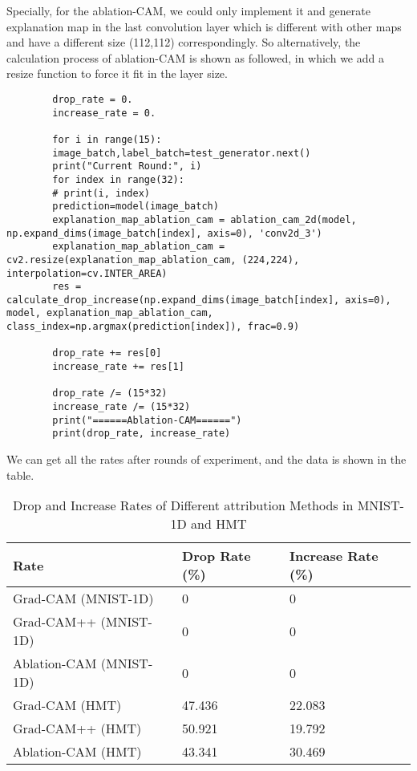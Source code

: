 \documentclass[conference]{IEEEtran}
\begin{document}
	Specially, for the ablation-CAM, we could only implement it and generate explanation map in the last convolution layer which is different with other maps and have a different size (112,112) correspondingly. So alternatively, the calculation process of ablation-CAM is shown as followed, in which we add a resize function to force it fit in the layer size.
	
	\begin{lstlisting}
		drop_rate = 0.
		increase_rate = 0.
		
		for i in range(15):
		image_batch,label_batch=test_generator.next()
		print("Current Round:", i)
		for index in range(32):
		# print(i, index)
		prediction=model(image_batch)
		explanation_map_ablation_cam = ablation_cam_2d(model, np.expand_dims(image_batch[index], axis=0), 'conv2d_3')
		explanation_map_ablation_cam = cv2.resize(explanation_map_ablation_cam, (224,224), interpolation=cv.INTER_AREA)
		res = calculate_drop_increase(np.expand_dims(image_batch[index], axis=0), model, explanation_map_ablation_cam, class_index=np.argmax(prediction[index]), frac=0.9)
		
		drop_rate += res[0]
		increase_rate += res[1]
		
		drop_rate /= (15*32)
		increase_rate /= (15*32)
		print("======Ablation-CAM======")
		print(drop_rate, increase_rate)
	\end{lstlisting}
	
	We can get all the rates after rounds of experiment, and the data is shown in the table.
	
	\begin{table}[h]
		\caption{Drop and Increase Rates of Different attribution Methods in MNIST-1D and HMT}
		\begin{tabular}{|l|l|l|}
			\hline
			Rate                    & Drop Rate (\%) & Increase Rate (\%) \\ \hline
			Grad-CAM (MNIST-1D)     & 0              & 0                  \\ \hline
			Grad-CAM++ (MNIST-1D)   & 0              & 0                  \\ \hline
			Ablation-CAM (MNIST-1D) & 0              & 0                  \\ \hline
			Grad-CAM (HMT)          & 47.436         & 22.083             \\ \hline
			Grad-CAM++ (HMT)        & 50.921         & 19.792             \\ \hline
			Ablation-CAM (HMT)      & 43.341         & 30.469             \\ \hline
		\end{tabular}
	\end{table}
	
\end{document}
